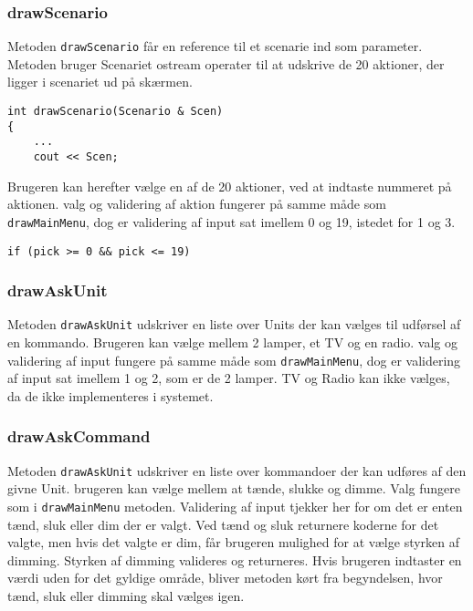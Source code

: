 \subsubsection{drawScenario}
Metoden \texttt{drawScenario} får en reference til et scenarie ind som parameter. Metoden bruger Scenariet ostream operater til at udskrive de 20 aktioner, der ligger i scenariet ud på skærmen.
\begin{lstlisting}
int drawScenario(Scenario & Scen) 
{	
	...
	cout << Scen;
\end{lstlisting}


Brugeren kan herefter vælge en af de 20 aktioner, ved at indtaste nummeret på aktionen. valg og validering af aktion fungerer på samme måde som \texttt{drawMainMenu}, dog er validering af input sat imellem 0 og 19, istedet for 1 og 3.
\begin{lstlisting}
if (pick >= 0 && pick <= 19)
\end{lstlisting}


\subsubsection{drawAskUnit}
Metoden \texttt{drawAskUnit} udskriver en liste over Units der kan vælges til udførsel af en kommando. Brugeren kan vælge mellem 2 lamper, et TV og en radio. valg og validering af input fungere på samme måde som \texttt{drawMainMenu}, dog er validering af input sat imellem 1 og 2, som er de 2 lamper. TV og Radio kan ikke vælges, da de ikke implementeres i systemet.

\subsubsection{drawAskCommand}
Metoden \texttt{drawAskUnit} udskriver en liste over kommandoer der kan udføres af den givne Unit. brugeren kan vælge mellem at tænde, slukke og dimme. Valg fungere som i \texttt{drawMainMenu} metoden. Validering af input tjekker her for om det er enten tænd, sluk eller dim der er valgt. Ved tænd og sluk returnere koderne for det valgte, men hvis det valgte er dim, får brugeren mulighed for at vælge styrken af dimming. Styrken af dimming valideres og returneres. Hvis brugeren indtaster en værdi uden for det gyldige område, bliver metoden kørt fra begyndelsen, hvor tænd, sluk eller dimming skal vælges igen.



